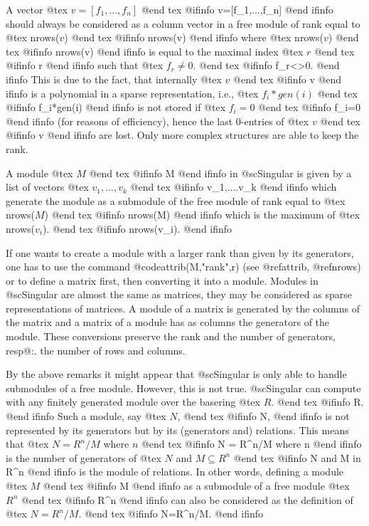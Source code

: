 A vector
@tex
$v=[f_1,...,f_n]$
@end tex
@ifinfo
v=[f_1,...,f_n]
@end ifinfo
should always be considered as a column vector in a free module
of rank equal to
@tex
nrows($v$)
@end tex
@ifinfo
nrows(v)
@end ifinfo
where 
@tex
nrows($v$)
@end tex
@ifinfo
nrows(v) 
@end ifinfo
is equal to the maximal index 
@tex
$r$
@end tex
@ifinfo
r
@end ifinfo
such that
@tex
$f_r \not= 0$.
@end tex
@ifinfo
f_r<>0.
@end ifinfo
This is due to the fact, that internally 
@tex
$v$
@end tex
@ifinfo
v
@end ifinfo
is a polynomial in a sparse representation, i.e.,
@tex
$f_i*gen(i)$
@end tex
@ifinfo
f_i*gen(i)
@end ifinfo
is not stored if
@tex
$f_i=0$
@end tex
@ifinfo
f_i=0
@end ifinfo
(for reasons of efficiency), hence the last 0-entries of 
@tex
$v$
@end tex
@ifinfo
v
@end ifinfo
are lost.
Only more complex structures are able to keep the rank.

A module 
@tex
$M$
@end tex
@ifinfo
M
@end ifinfo
in @sc{Singular} is given by a list of vectors
@tex
$v_1,...,v_k$
@end tex
@ifinfo
v_1,....v_k
@end ifinfo
which generate the module as a submodule of the free module of rank
equal to 
@tex
nrows($M$)
@end tex
@ifinfo
nrows(M)
@end ifinfo
which is the maximum of
@tex
nrows($v_i$).
@end tex
@ifinfo
nrows(v_i).
@end ifinfo

If one wants to create a module with a larger rank than given by its
generators, one has to use the command @code{attrib(M,"rank",r)} (see
@ref{attrib}, @ref{nrows}) or to define a matrix first, then converting it
into a module.  Modules in @sc{Singular} are almost the same as
matrices, they may be considered as sparse representations of matrices.
A module of a matrix is generated by the columns of the matrix and a
matrix of a module has as columns the generators of the module.  These
conversions preserve the rank and the number of generators, resp@:. the
number of rows and columns.

By the above remarks it might appear that @sc{Singular} is only able to handle
submodules of a free module. However, this is not true. @sc{Singular}
can compute with any finitely generated module over the basering 
@tex
$R$.
@end tex 
@ifinfo
R.
@end ifinfo
Such a module, say 
@tex
$N$,
@end tex
@ifinfo
N,
@end ifinfo
is not represented by its generators but by its
(generators and) relations. This means that
@tex
$N = R^n/M$ where $n$ 
@end tex
@ifinfo
N = R^n/M where n
@end ifinfo
is the number of generators of 
@tex
$N$ and $M \subseteq R^n$
@end tex
@ifinfo
N and M in R^n
@end ifinfo
is the module of relations.
In other words, defining  a module 
@tex
$M$
@end tex
@ifinfo
M
@end ifinfo
as a submodule of a free module
@tex
$R^n$
@end tex
@ifinfo
R^n
@end ifinfo
can also be considered as the definition of
@tex
$N = R^n/M$.
@end tex
@ifinfo
N=R^n/M.
@end ifinfo

